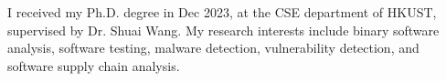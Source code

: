 I received my Ph.D. degree in Dec 2023, at the CSE department of HKUST, supervised by Dr. Shuai Wang. My research interests include binary software analysis, software testing, malware detection, vulnerability detection,
and software supply chain analysis.
